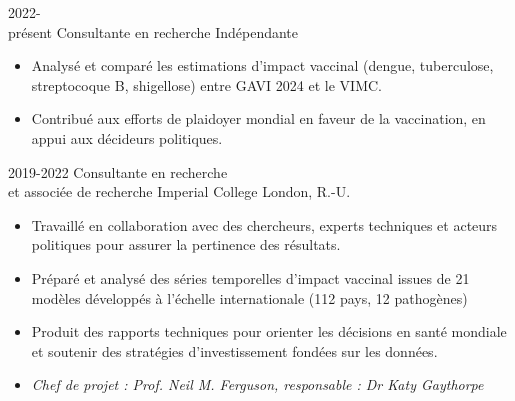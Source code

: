 \documentclass[icon]{twentysecondcv}
\begin{document}
\begin{twenty} %


 \twentyitem
    	{2022-\\présent}
    	{Consultante en recherche}
	{Indépendante}
        	{ \begin{itemize}  \small
        	 \item Analysé et comparé les estimations d’impact vaccinal (dengue, tuberculose, streptocoque B, shigellose) entre GAVI 2024 et le VIMC.
        	 \item Contribué aux efforts de plaidoyer mondial en faveur de la vaccination, en appui aux décideurs politiques.
        	   \end{itemize}
        	
        	}
        	
	
 \twentyitem
       {2019-2022}
       {Consultante en recherche \\ et associée de recherche}
       {Imperial College London, R.-U.}
       { \begin{itemize}  \small
       
      \item Travaillé en collaboration avec des chercheurs, experts techniques et acteurs politiques pour assurer la pertinence des résultats.
      \item  Préparé et analysé des séries temporelles d’impact vaccinal issues de 21 modèles développés à l’échelle internationale (112 pays, 12 pathogènes)
      \item Produit des rapports techniques pour orienter les décisions en santé mondiale et soutenir des stratégies d’investissement fondées sur les données.
      \item \textit{Chef de projet : Prof. Neil M. Ferguson, responsable : Dr Katy Gaythorpe}
       \end{itemize}
       }
       

\end{twenty}
\end{document}
